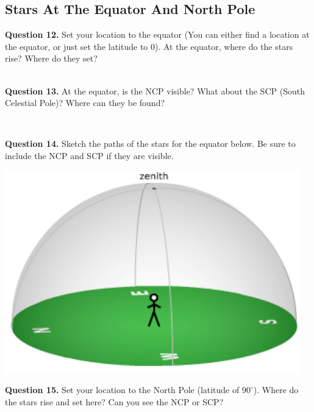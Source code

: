 \documentclass[11pt]{article}
\begin{document}
\subsection{Stars At The Equator And North Pole}

\textbf{Question 12.} Set your location to the equator (You can either find a location at the equator, or just set the latitude to 0). At the equator, where do the stars rise? Where do they set? \\
\vspace*{1.5cm}

\hrulefill\\

\textbf{Question 13.} At the equator, is the NCP visible? What about the SCP (South Celestial Pole)? Where can they be found? \\
\vspace*{1.5cm}

\hrulefill\\

\newpage

\textbf{Question 14.} Sketch the paths of the stars for the equator below. Be sure to include the NCP and SCP if they are visible. \\
\vspace*{1.5cm}

\begin{center}
	\includegraphics{local_sky} 
\end{center}

\textbf{Question 15.} Set your location to the North Pole (latitude of $90^\circ$). Where do the stars rise and set here? Can you see the NCP or SCP?\\
\vspace*{1.5cm}
\end{document}
